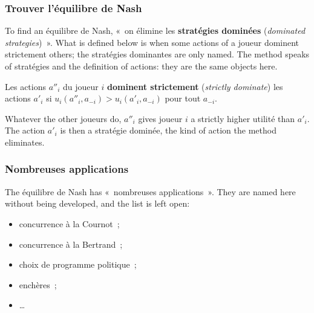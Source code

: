 \subsubsection{Trouver l'équilibre de Nash}

To find an équilibre de Nash, «~on élimine les \textbf{stratégies dominées}
(\textit{dominated strategies})~». What is defined below is when some actions of a
joueur dominent strictement others; the stratégies dominantes are only named. The
method speaks of stratégies and the definition of actions: they
are the same objects here.

\begin{definition}
  Les actions $a''_i$ du joueur $i$ \textbf{dominent strictement}
  (\textit{strictly dominate}) les actions $a'_i$ si
  $u_i(a''_i, a_{-i}) > u_i(a'_i, a_{-i})$ pour tout $a_{-i}$.
\end{definition}

Whatever the other joueurs do, $a''_i$ gives joueur $i$ a strictly higher utilité
than $a'_i$. The action $a'_i$ is then a stratégie dominée, the kind of action the
method eliminates.

\subsubsection{Nombreuses applications}

The équilibre de Nash has «~nombreuses applications~». They are named here without
being developed, and the list is left open:
\begin{itemize}
  \item concurrence à la Cournot~;
  \item concurrence à la Bertrand~;
  \item choix de programme politique~;
  \item enchères~;
  \item \ldots
\end{itemize}
